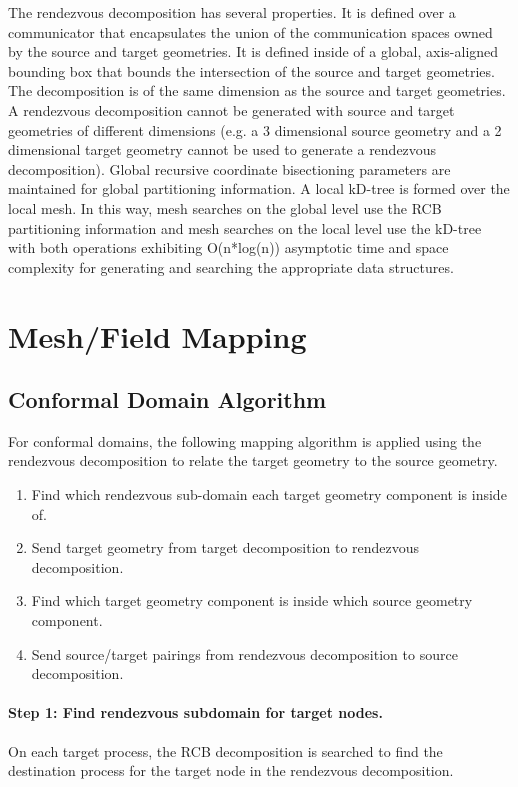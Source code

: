 \documentclass[letterpaper,12pt]{article}
\begin{document}
The rendezvous decomposition has several properties. It is defined
over a communicator that encapsulates the union of the communication
spaces owned by the source and target geometries. It is defined inside
of a global, axis-aligned bounding box that bounds the intersection of
the source and target geometries. The decomposition is of the same
dimension as the source and target geometries. A rendezvous
decomposition cannot be generated with source and target geometries of
different dimensions (e.g. a 3 dimensional source geometry and a 2
dimensional target geometry cannot be used to generate a rendezvous
decomposition). Global recursive coordinate bisectioning parameters
are maintained for global partitioning information. A local kD-tree is
formed over the local mesh. In this way, mesh searches on the global
level use the RCB partitioning information and mesh searches on the
local level use the kD-tree with both operations exhibiting
O(n*log(n)) asymptotic time and space complexity for generating and
searching the appropriate data structures.

\clearpage

\section{Mesh/Field Mapping}\label{sec:map}

\subsection{Conformal Domain Algorithm}\label{subsec:map_algorithm}
For conformal domains, the following mapping algorithm is applied
using the rendezvous decomposition to relate the target geometry to
the source geometry.

\begin{enumerate}
\item Find which rendezvous sub-domain each target geometry component
  is inside of.
\item Send target geometry from target decomposition to rendezvous
  decomposition.
\item Find which target geometry component is inside which source
  geometry component.
\item Send source/target pairings from rendezvous decomposition to
  source decomposition.
\end{enumerate}

\paragraph{Step 1: Find rendezvous subdomain for target nodes.}
On each target process, the RCB decomposition is searched to find the
destination process for the target node in the rendezvous
decomposition.
\end{document}
